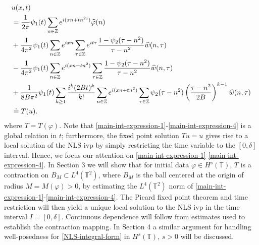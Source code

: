 \documentclass[12pt,reqno]{amsart}
\newcommand{\wh}{\widehat}
\newcommand{\zz}{\mathbb{Z}}
\newcommand{\ci}{\mathbb{T}}
\newcommand{\vp}{\varphi}
\theoremstyle{plain}  %
\begin{document}
\begin{align}
	\label{main-int-expression-1}
	& u(x, t) \notag
		\\
		& = \frac{1}{2 \pi} \psi_1(t) \sum_{n \in \zz} e^{i(xn + tn^{2 
		j})} \widehat{\vp}(n) 
		\\
		\label{main-int-expression-2}
		& + \frac{1}{4 \pi^2} \psi_1(t) \sum_{n \in \zz} e^{ixn} \sum_{\tau \in \zz} 
		e^{it \tau} \frac{ 1 - \psi_2(\tau - n^2) 
		}{\tau - n^2} \wh{w}(n, \tau) 
		\\
		\label{main-int-expression-3}
		& - \frac{1}{4 \pi^2} \psi_1(t) \sum_{n \in \zz} e^{i(xn + 
		tn^2)}
		\sum_{\tau \in \zz} \frac{1- \psi_2(\tau - n^2)}{\tau - n^2} \wh{w}(n, \tau) 
		\\
		\label{main-int-expression-4}
		& + \frac{1}{8 B \pi^2} \psi_1(t) \sum_{k \ge 1} \frac{i^k (2Bt)^k}{k!}
		\sum_{n \in \zz} e^{i(xn + tn^2 )}
		\sum_{\tau \in \zz}	\psi_2 (\tau - n^2) \left(\frac{\tau - 
		n^2}{2B} \right)^{k -1} \wh{w}(n, \tau) 
		\\
		& \doteq T(u). \notag
\end{align}
where $T = T(\vp)$. Note that 
\eqref{main-int-expression-1}-\eqref{main-int-expression-4} is a global 
relation in $t$; furthermore, the fixed point solution $Tu=u$ gives rise to a 
local solution of the NLS ivp by simply restricting the time 
variable to 
the $[0, \delta]$ interval. Hence, we focus our attention on 
\eqref{main-int-expression-1}-\eqref{main-int-expression-4}. In 
Section 3 we will show that for initial data $\vp \in H^s(\ci)$, $T$ is 
a contraction on $B_M 
\subset L^4(\ci^2)$, where $B_M$ is the ball centered at 
the origin of radius $M = M(\vp) > 0$, by estimating the $L^4(\ci^2)$
norm of 
\eqref{main-int-expression-1}-\eqref{main-int-expression-4}. The Picard 
fixed point theorem and time restriction will
then yield a unique local solution to the NLS ivp in the time interval
$I = [0, \delta]$. Continuous 
dependence will follow from estimates used to establish the contraction 
mapping.  In Section 4 a similar argument for handling well-posedness for 
\eqref{NLS-integral-form} in $H^s(\ci)$, $s > 0$ will be discussed.
%
%
%
%
%
%
%
%
%
%
\end{document}

